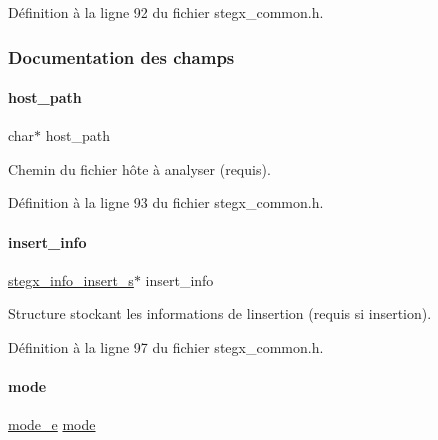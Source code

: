 Définition à la ligne 92 du fichier stegx\+\_\+common.\+h.



\subsubsection{Documentation des champs}
\mbox{\label{a00142_a7bb2664c5894a0e9e7e4eaf6c3701105}} 
\paragraph{\texorpdfstring{host\+\_\+path}{host\_path}}
{\footnotesize\ttfamily char$\ast$ host\+\_\+path}

Chemin du fichier hôte à analyser (requis). 

Définition à la ligne 93 du fichier stegx\+\_\+common.\+h.

\mbox{\label{a00142_a5a94555004756ce4454f6a055906763a}} 
\paragraph{\texorpdfstring{insert\+\_\+info}{insert\_info}}
{\footnotesize\ttfamily \hyperlink{a00008_a176cafec595278af1f86f1e9ef478cb0}{stegx\+\_\+info\+\_\+insert\+\_\+s}$\ast$ insert\+\_\+info}

Structure stockant les informations de l\textquotesingle{}insertion (requis si insertion). 

Définition à la ligne 97 du fichier stegx\+\_\+common.\+h.

\mbox{\label{a00142_a53c249857abc01a599a933ee5c4e1841}} 
\paragraph{\texorpdfstring{mode}{mode}}
{\footnotesize\ttfamily \hyperlink{a00008_a3410d2f61b2ebef290660e7d14215bbd}{mode\+\_\+e} \hyperlink{a00008_a1a6b6fb557d8d37d59700faf4e4c9167}{mode}}

